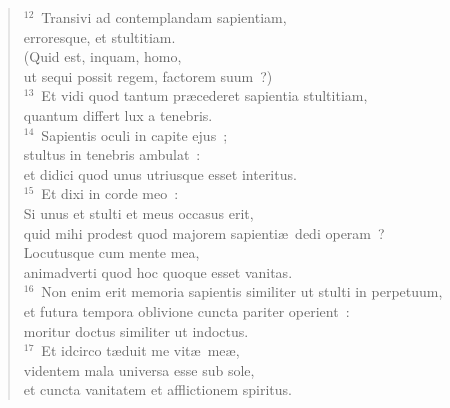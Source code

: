 \begin{verse}${}^{12}$~Transivi ad contemplandam sapientiam,\\ erroresque, et stultitiam.\\ (Quid est, inquam, homo,\\ ut sequi possit regem, factorem suum~?)\\
${}^{13}$~Et vidi quod tantum pr\ae cederet sapientia stultitiam,\\ quantum differt lux a tenebris.\\
${}^{14}$~Sapientis oculi in capite ejus~;\\ stultus in tenebris ambulat~:\\ et didici quod unus utriusque esset interitus.\\
${}^{15}$~Et dixi in corde meo~:\\ Si unus et stulti et meus occasus erit,\\ quid mihi prodest quod majorem sapienti\ae\ dedi operam~?\\ Locutusque cum mente mea,\\ animadverti quod hoc quoque esset vanitas.\\
${}^{16}$~Non enim erit memoria sapientis similiter ut stulti in perpetuum,\\ et futura tempora oblivione cuncta pariter operient~:\\ moritur doctus similiter ut indoctus.\\
${}^{17}$~Et idcirco t\ae duit me vit\ae\ me\ae ,\\ videntem mala universa esse sub sole,\\ et cuncta vanitatem et afflictionem spiritus.\end{verse}


